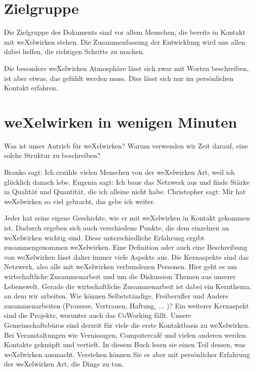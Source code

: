   \section{Zielgruppe}
    Die Zielgruppe des Dokuments sind vor allem Menschen, die bereits in Kontakt mit weXelwirken stehen.
    Die Zusammenfassung der Entwicklung wird uns allen dabei helfen, die richtigen Schritte zu machen. 




    Die besondere weXelwirken Atmosphäre lässt sich zwar mit Worten beschreiben, ist aber etwas, das gefühlt werden muss.
    Dies lässt sich nur im persönlichen Kontakt erfahren.

  \section{weXelwirken in wenigen Minuten}
    Was ist unser Antrieb für weXelwirken? Warum verwenden wir Zeit darauf, eine solche Struktur zu beschreiben?



    Branko sagt: Ich erzähle vielen Menschen von der weXelwirken Art, weil ich glücklich danach lebe.
    Eugenia sagt: Ich baue das Netzwerk aus und finde Stärke in Qualität und Quantität, die ich alleine nicht habe.
    Christopher sagt: Mir hat weXelwirken so viel gebracht, das gebe ich weiter.



    Jeder hat seine eigene Geschichte, wie er mit weXelwirken in Kontakt gekommen ist. 
    Dadurch ergeben sich auch verschiedene Punkte, die dem einzelnen an weXelwirken wichtig sind.
    Diese unterschiedliche Erfahrung ergibt zusammengenommen weXelwirken.
    Eine Definition oder auch eine Beschreibung von weXelwirken lässt daher immer viele Aspekte aus.
    Die Kernaspekte sind das Netzwerk, also alle mit weXelwirken verbundenen Personen.
    Hier geht es um wirtschaftliche Zusammenarbeit und um die Diskussion Themen aus unserer Lebenswelt.
    Gerade die wirtschaftliche Zusammenarbeit ist dabei ein Kernthema, an dem wir arbeiten.
    Wie können Selbstständige, Freiberufler und Andere zusammenarbeiten (Prozesse, Vertrauen, Haftung, ... )?
    Ein weiterer Kernaspekt sind die Projekte, worunter auch das CoWorking fällt. 
    Unsere Gemeinschaftsbüros sind derzeit für viele die erste Kontaktbasis zu weXelwirken.
    Bei Veranstaltungen wie Vernissagen, Computercafé und vielen anderen werden Kontakte geknüpft und vertieft.
    In diesem Buch lesen sie einen Teil dessen, was weXelwirken ausmacht.
    Verstehen können Sie es aber mit persönlicher Erfahrung der weXelwirken Art, die Dinge zu tun.
    